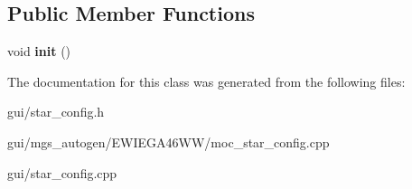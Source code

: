 \subsection*{Public Member Functions}
\begin{DoxyCompactItemize}
\item 
\mbox{\label{classmgs_1_1StarConfig_a07ad69b5260f542bfc5874dc5696365e}} 
void {\bfseries init} ()
\end{DoxyCompactItemize}


The documentation for this class was generated from the following files\+:\begin{DoxyCompactItemize}
\item 
gui/star\+\_\+config.\+h\item 
gui/mgs\+\_\+autogen/\+E\+W\+I\+E\+G\+A46\+W\+W/moc\+\_\+star\+\_\+config.\+cpp\item 
gui/star\+\_\+config.\+cpp\end{DoxyCompactItemize}
